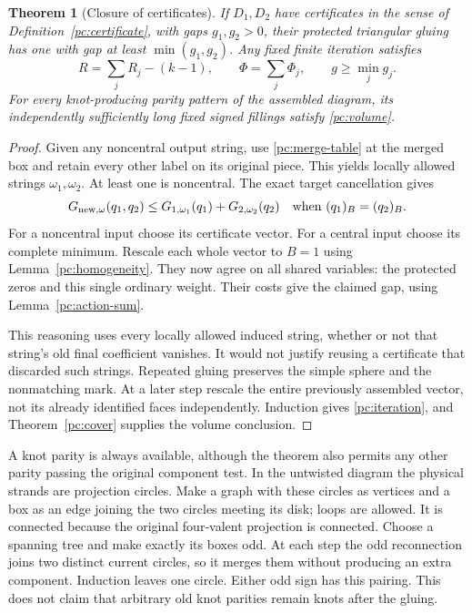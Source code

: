 \documentclass[11pt]{article}
\numberwithin{equation}{section}
\newtheorem{theorem}{Theorem}[section]
\theoremstyle{definition}\newtheorem{definition}[theorem]{Definition}
\theoremstyle{remark}\newtheorem{remark}[theorem]{Remark}
\begin{document}
\begin{theorem}[Closure of certificates]\label{pc:gluing}
If \(D_1,D_2\) have certificates in the sense of
Definition~\ref{pc:certificate}, with gaps \(g_1,g_2>0\), their
protected triangular gluing has one with gap at least
\(\min(g_1,g_2)\). Any fixed finite iteration satisfies
\begin{equation}\label{pc:iteration}
 R=\sum_jR_j-(k-1),\qquad
 \Phi=\sum_j\Phi_j,\qquad g\ge\min_jg_j.
\end{equation}
For every knot-producing parity pattern of the assembled diagram,
its independently sufficiently long fixed signed fillings satisfy
\eqref{pc:volume}.
\end{theorem}
\begin{proof}
Given any noncentral output string, use \eqref{pc:merge-table} at
the merged box and retain every other label on its original piece.
This yields locally allowed strings \(\omega_1,\omega_2\).
At least one is noncentral. The exact target cancellation gives
\[
 G_{{\rm new},\omega}(q_1,q_2)
                   \le G_{1,\omega_1}(q_1)+G_{2,\omega_2}(q_2)
 \quad\text{when }(q_1)_B=(q_2)_B.
\]
For a noncentral input choose its certificate vector. For a central
input choose its complete minimum. Rescale each whole vector to
\(B=1\) using Lemma~\ref{pc:homogeneity}. They now agree on all
shared variables: the protected zeros and this single ordinary
weight. Their costs give the claimed gap, using
Lemma~\ref{pc:action-sum}.

This reasoning uses every locally allowed induced string, whether
or not that string's old final coefficient vanishes. It would not
justify reusing a certificate that discarded such strings.
Repeated gluing preserves the simple sphere and the nonmatching
mark. At a later step rescale the entire previously assembled
vector, not its already identified faces independently.
Induction gives \eqref{pc:iteration}, and
Theorem~\ref{pc:cover} supplies the volume conclusion.
\end{proof}

A knot parity is always available, although the theorem also permits
any other parity passing the original component test. In the
untwisted diagram the physical strands are projection circles.
Make a graph with these circles as vertices and a box as an edge
joining the two circles meeting its disk; loops are allowed.
It is connected because the original four-valent projection is
connected. Choose a spanning tree and make exactly its boxes odd.
At each step the odd reconnection joins two distinct current
circles, so it merges them without producing an extra component.
Induction leaves one circle. Either odd sign has this pairing.
This does not claim that arbitrary old knot parities remain knots
after the gluing.
\end{document}

